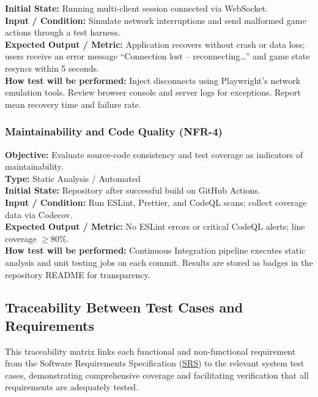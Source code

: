\documentclass[12pt, titlepage]{article}
\begin{document}
    \textbf{Initial State:} Running multi-client session connected via WebSocket. \\

    \textbf{Input / Condition:} Simulate network interruptions and send malformed game actions through a test harness. \\

    \textbf{Expected Output / Metric:} Application recovers without crash or data loss; users receive an error message ``Connection lost – reconnecting…'' and game state resyncs within 5 seconds. \\

    \textbf{How test will be performed:}
    Inject disconnects using Playwright’s network emulation tools. Review browser console and server logs for exceptions. Report mean recovery time and failure rate.

    \subsubsection{Maintainability and Code Quality (NFR-4)}
    \textbf{Objective:} Evaluate source-code consistency and test coverage as indicators of maintainability. \\

    \textbf{Type:} Static Analysis / Automated \\

    \textbf{Initial State:} Repository after successful build on GitHub Actions. \\

    \textbf{Input / Condition:} Run ESLint, Prettier, and CodeQL scans; collect coverage data via Codecov. \\

    \textbf{Expected Output / Metric:} No ESLint errors or critical CodeQL alerts; line coverage $\geq 80$\%. \\

    \textbf{How test will be performed:}
    Continuous Integration pipeline executes static analysis and unit testing jobs on each commit. Results are stored as badges in the repository README for transparency.



\subsection{Traceability Between Test Cases and Requirements}
This traceability matrix links each functional and non-functional requirement from the Software Requirements Specification (\href{../SRS/SRS.pdf}{SRS}) to the relevant system test cases, demonstrating comprehensive coverage and facilitating verification that all requirements are adequately tested.
\end{document}
